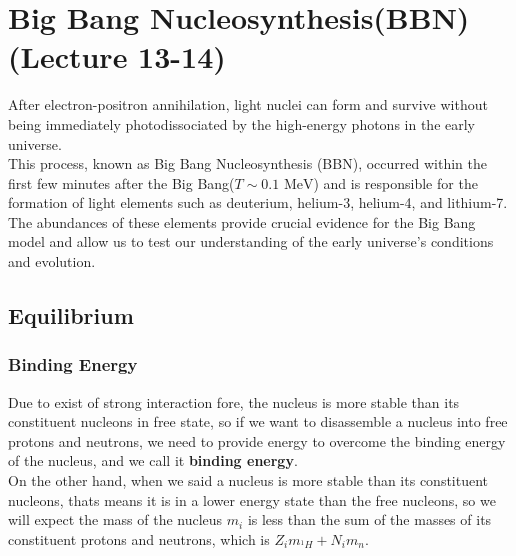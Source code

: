 
\chapter{Big Bang Nucleosynthesis(BBN) (Lecture 13-14)}
\quad After electron-positron annihilation, light nuclei can form and survive without being immediately photodissociated by the high-energy photons in the early universe. \\

This process, known as Big Bang Nucleosynthesis (BBN), occurred within the first few minutes after the Big Bang($ T \sim 0.1 \text{ MeV} $) and is responsible for the formation of light elements such as deuterium, helium-3, helium-4, and lithium-7. \\

The abundances of these elements provide crucial evidence for the Big Bang model and allow us to test our understanding of the early universe's conditions and evolution.

\bigskip
\section{Equilibrium}
\subsection{Binding Energy}
\begin{intuition}
    Due to exist of strong interaction fore, the nucleus is more stable than its constituent nucleons in free state, so if we want to disassemble a nucleus into free protons and neutrons, we need to provide energy to overcome the binding energy of the nucleus, and we call it \textbf{binding energy}. \\

    On the other hand, when we said a nucleus is more stable than its constituent nucleons, thats means it is in a lower energy state than the free nucleons, so we will expect the mass of the nucleus $m_i$ is less than the sum of the masses of its constituent protons and neutrons, which is $Z_i m_{^{1}H} + N_i m_n$. \\
\end{intuition}

